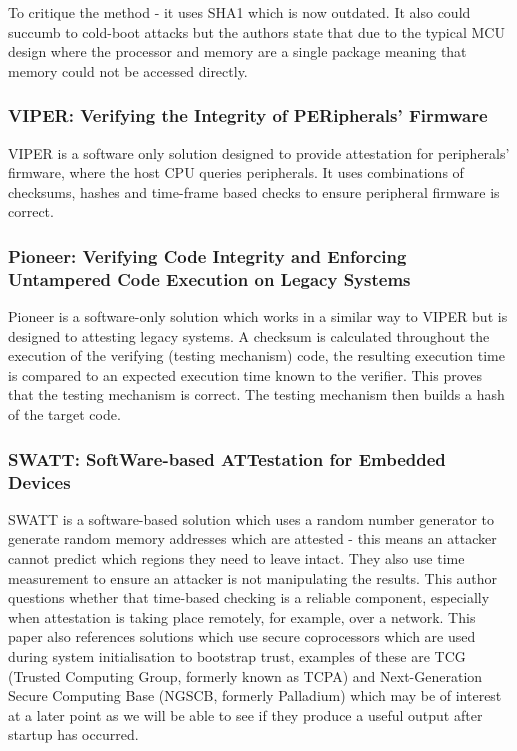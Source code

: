 To critique the method - it uses SHA1 which is now outdated. It also could succumb to cold-boot attacks but the authors state that due to the typical MCU design where the processor and memory are a single package meaning that memory could not be accessed directly.

\subsubsection{VIPER: Verifying the Integrity of PERipherals’ Firmware}

VIPER \cite{Li2011} is a software only solution designed to provide attestation for peripherals’ firmware, where the host CPU queries peripherals. It uses combinations of checksums, hashes and time-frame based checks to ensure peripheral firmware is correct.

\subsubsection{Pioneer: Verifying Code Integrity and Enforcing Untampered Code Execution on Legacy Systems}

Pioneer \cite{Seshadri2007} is a software-only solution which works in a similar way to VIPER but is designed to attesting legacy systems. A checksum is calculated throughout the execution of the verifying (testing mechanism) code, the resulting execution time is compared to an expected execution time known to the verifier. This proves that the testing mechanism is correct. The testing mechanism then builds a hash of the target code.

\subsubsection{SWATT: SoftWare-based ATTestation for Embedded Devices}

SWATT \cite{Seshadri2004} is a software-based solution which uses a random number generator to generate random memory addresses which are attested - this means an attacker cannot predict which regions they need to leave intact. They also use time measurement to ensure an attacker is not manipulating the results. This author questions whether that time-based checking is a reliable component, especially when attestation is taking place remotely, for example, over a network.
\ifnotesincluded
{} 
\fi
This paper also references solutions which use secure coprocessors which are used during system initialisation to bootstrap trust, examples of these are TCG (Trusted Computing Group, formerly known as TCPA) and Next-Generation Secure Computing Base (NGSCB, formerly Palladium) which may be of interest at a later point as we will be able to see if they produce a useful output after startup has occurred.


